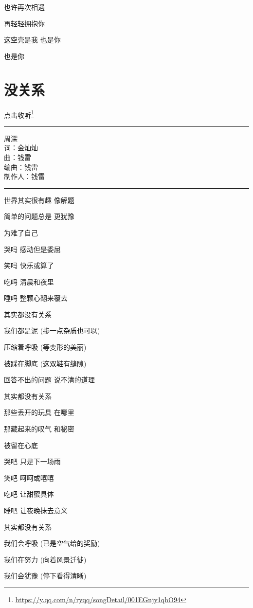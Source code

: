 \documentclass[]{ctexbook}
\renewcommand{\href}[2]{#2\footnote{\url{#1}}}
\begin{document}
也许再次相遇

再轻轻拥抱你

这空壳是我 也是你

也是你

\section*{没关系}\label{life-is-like-a-box-of-chocolates}


\href{https://y.qq.com/n/ryqq/songDetail/001EGnjy1qhO94}{点击收听}

\begin{center}\rule{0.5\linewidth}{0.5pt}\end{center}

周深\\
词：金灿灿\\
曲：钱雷\\
编曲：钱雷\\
制作人：钱雷

\begin{center}\rule{0.5\linewidth}{0.5pt}\end{center}

世界其实很有趣 像解题

简单的问题总是 更犹豫

为难了自己

哭吗 感动但是委屈

笑吗 快乐或算了

吃吗 清晨和夜里

睡吗 整颗心翻来覆去

其实都没有关系

我们都是泥 (掺一点杂质也可以)

压缩着呼吸 (等变形的美丽)

被踩在脚底 (这双鞋有缝隙)

回答不出的问题 说不清的道理

其实都没有关系

那些丢开的玩具 在哪里

那藏起来的叹气 和秘密

被留在心底

哭吧 只是下一场雨

笑吧 呵呵或嘻嘻

吃吧 让甜蜜具体

睡吧 让夜晚抹去意义

其实都没有关系

我们会呼吸 (已是空气给的奖励)

我们在努力 (向着风景迁徙)

我们会犹豫 (停下看得清晰)
\end{document}
